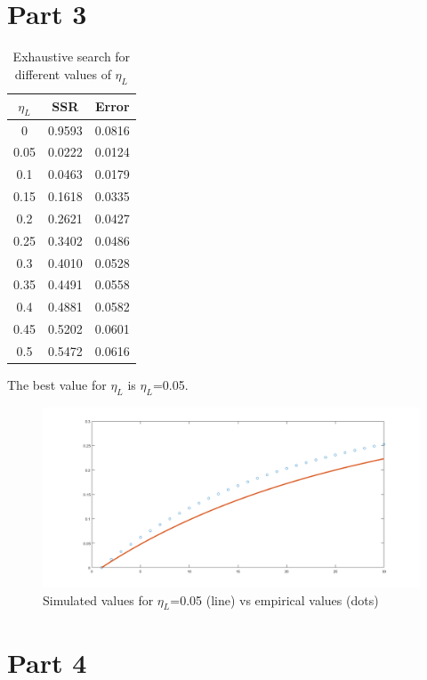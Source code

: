 \documentclass[a4paper]{article}
\begin{document}
\section{Part 3}

\begin{table}[!h]
\centering
\begin{tabular}{c|c|c}
\textbf{$\eta_{L}$} & \textbf{SSR} & Error\\ \hline
                                                                                                                 
                                   
0 & 0.9593 & 0.0816  \\                                       
0.05 & 0.0222 &  0.0124  \\
0.1  & 0.0463  & 0.0179 \\
0.15  &  0.1618 & 0.0335  \\  
0.2  & 0.2621   & 0.0427\\
0.25 & 0.3402 &  0.0486\\
0.3 & 0.4010 &  0.0528  \\
0.35 & 0.4491  &  0.0558  \\ 
0.4  & 0.4881 & 0.0582 \\
0.45  & 0.5202 &  0.0601\\
0.5 &  0.5472 & 0.0616 
\end{tabular}
\caption{Exhaustive search for different values of $\eta_{L}$}
\label{tab:exaustive_searchSSR}
\end{table}
The best value for $\eta_{L}$ is $\eta_{L}$=0.05.

\begin{figure}[!h]
\center
\includegraphics[width=1.3\textwidth]{res/img/plotdiff}
\caption{Simulated values for  $\eta_{L}$=0.05 (line) vs empirical values (dots)}
\label{fig:part3}
\end{figure}

\section{Part 4}
\end{document}

